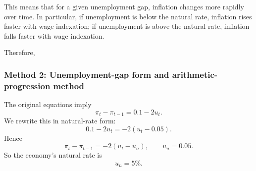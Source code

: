 \documentclass[12pt]{article}
\begin{document}
\begin{enumerate}[label=(\alph*)]
    This means that for a given unemployment gap, inflation changes more rapidly over time. In particular, if unemployment is below the natural rate, inflation rises faster with wage indexation; if unemployment is above the natural rate, inflation falls faster with wage indexation.

    Therefore,
    \begin{center}
    \end{center}
\end{enumerate}

\subsubsection{Method 2: Unemployment-gap form and arithmetic-progression method}
The original equations imply
\[
\pi_t-\pi_{t-1}=0.1-2u_t.
\]
We rewrite this in natural-rate form:
\[
0.1-2u_t=-2(u_t-0.05).
\]
Hence
\[
\pi_t-\pi_{t-1}=-2(u_t-u_n),
\qquad
u_n=0.05.
\]
So the economy's natural rate is
\[
\boxed{u_n=5\%.}
\]
\end{document}
